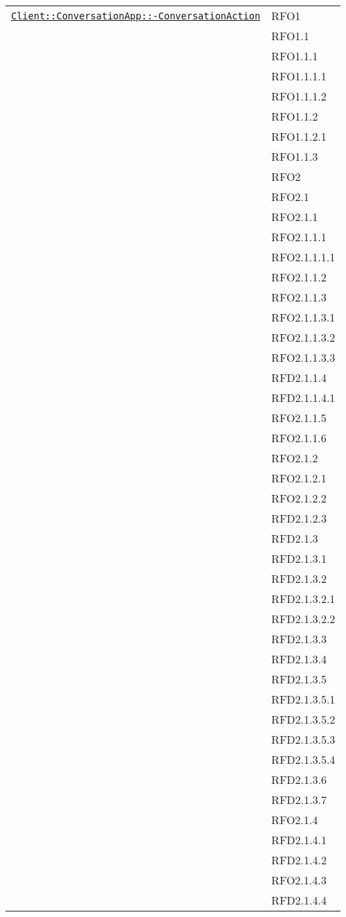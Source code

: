 \begin{longtable}{|>{\centering}m{10cm}|m{3cm}<{\centering}|}
\hyperref[Client::ConversationApp::ConversationAction]{\texttt{Client::ConversationApp::-\linebreak ConversationAction}} & RFO1\\
& RFO1.1\\
& RFO1.1.1\\
& RFO1.1.1.1\\
& RFO1.1.1.2\\
& RFO1.1.2\\
& RFO1.1.2.1\\
& RFO1.1.3\\
& RFO2\\
& RFO2.1\\
& RFO2.1.1\\
& RFO2.1.1.1\\
& RFO2.1.1.1.1\\
& RFO2.1.1.2\\
& RFO2.1.1.3\\
& RFO2.1.1.3.1\\
& RFO2.1.1.3.2\\
& RFO2.1.1.3.3\\
& RFD2.1.1.4\\
& RFD2.1.1.4.1\\
& RFO2.1.1.5\\
& RFO2.1.1.6\\
& RFO2.1.2\\
& RFO2.1.2.1\\
& RFO2.1.2.2\\
& RFD2.1.2.3\\
& RFD2.1.3\\
& RFD2.1.3.1\\
& RFD2.1.3.2\\
& RFD2.1.3.2.1\\
& RFD2.1.3.2.2\\
& RFD2.1.3.3\\
& RFD2.1.3.4\\
& RFD2.1.3.5\\
& RFD2.1.3.5.1\\
& RFD2.1.3.5.2\\
& RFD2.1.3.5.3\\
& RFD2.1.3.5.4\\
& RFD2.1.3.6\\
& RFD2.1.3.7\\
& RFO2.1.4\\
& RFD2.1.4.1\\
& RFD2.1.4.2\\
& RFO2.1.4.3\\
& RFD2.1.4.4\\

\end{longtable}
